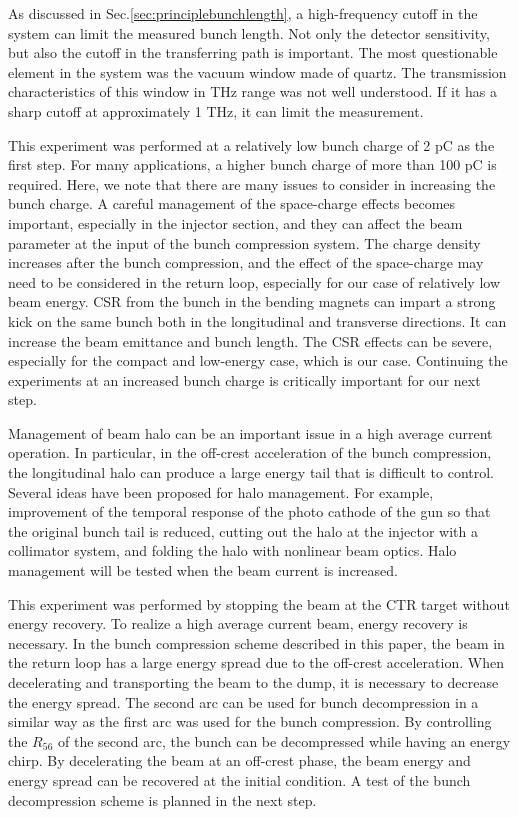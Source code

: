 \documentclass[review]{elsarticle}
\begin{document}
As discussed in Sec.\ref{sec:principlebunchlength},
a high-frequency cutoff in the system can limit the measured bunch length.
Not only the detector sensitivity,
but also the cutoff in the transferring path is important. 
The most questionable element in the system was the vacuum window made of quartz.
The transmission characteristics of this window in THz range was not well understood.
If it has a sharp cutoff at approximately 1 THz,
it can limit the measurement.

This experiment was performed 
at a relatively low bunch charge of 2 pC
as the first step.
For many applications, 
a higher bunch charge of more than 100 pC is required.
Here, 
we note that there are many issues to consider 
in increasing the bunch charge.
A careful management of the space-charge effects becomes important,
especially in the injector section,
and they can affect 
the beam parameter at the input of the bunch compression system.
The charge density increases after the bunch compression,
and the effect of the space-charge may need to be considered
in the return loop, especially for our case of relatively low beam energy.
CSR from the bunch in the bending magnets 
can impart a strong kick on the same bunch
both in the longitudinal and transverse directions.
It can increase the beam emittance and bunch length.
The CSR effects can be severe,
especially for the compact and low-energy case, which is our case.
Continuing the experiments at an increased bunch charge
is critically important for our next step.


Management of beam halo can be an important issue
in a high average current operation.
In particular, in the off-crest acceleration of the bunch compression,
the longitudinal halo can produce a large energy tail
that is difficult to control.
Several ideas have been proposed for halo management.
For example,
improvement of the temporal response of 
the photo cathode of the gun so that the original bunch tail is reduced,
cutting out the halo at the injector with a collimator system,
and
folding the halo with nonlinear beam optics.
Halo management will be tested
when the beam current is increased.



This experiment was performed by stopping the beam at the CTR target
without energy recovery.
To realize a high average current beam,
energy recovery is necessary.
In the bunch compression scheme described in this paper,
the beam in the return loop has a large energy spread
due to the off-crest acceleration.
When decelerating and transporting the beam to the dump,
it is necessary to decrease the energy spread.
The second arc can be used for bunch decompression 
in a similar way as the first arc was used for the bunch compression.
By controlling the $R_{56}$ of the second arc,
the bunch can be decompressed while having an energy chirp.
By decelerating the beam at an off-crest phase,
the beam energy and energy spread can be recovered at the initial condition.
A test of the bunch decompression scheme is planned in the next step.
\end{document}
